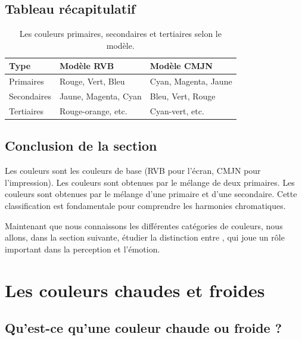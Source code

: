 \subsection{Tableau récapitulatif}

\begin{table}[h!]
\centering
\begin{tabular}{@{}lll@{}}
\toprule
\textbf{Type} & \textbf{Modèle RVB} & \textbf{Modèle CMJN} \\
\midrule
Primaires & Rouge, Vert, Bleu & Cyan, Magenta, Jaune \\
Secondaires & Jaune, Magenta, Cyan & Bleu, Vert, Rouge \\
Tertiaires & Rouge-orange, etc. & Cyan-vert, etc. \\
\bottomrule
\end{tabular}
\caption{Les couleurs primaires, secondaires et tertiaires selon le modèle.}
\end{table}

\subsection*{Conclusion de la section}

\begin{retenir}
Les couleurs  sont les couleurs de base (RVB pour l'écran, CMJN pour l'impression). Les couleurs  sont obtenues par le mélange de deux primaires. Les couleurs  sont obtenues par le mélange d'une primaire et d'une secondaire. Cette classification est fondamentale pour comprendre les harmonies chromatiques.
\end{retenir}

Maintenant que nous connaissons les différentes catégories de couleurs, nous allons, dans la section suivante, étudier la distinction entre , qui joue un rôle important dans la perception et l'émotion.

\section{Les couleurs chaudes et froides}

\subsection{Qu'est-ce qu'une couleur chaude ou froide ?}


